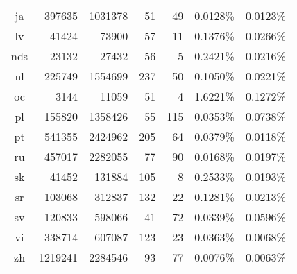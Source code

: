 \documentclass[a4paper]{article}
\begin{document}
\begin{appendix}
\begin{table}[H]
\begin{tabular}{c|r|r|r|r|r|r}
    ja&    397635&   1031378&          51&         49&      0.0128\% &   0.0123\% \\
    lv&     41424&     73900&          57&         11&      0.1376\% &   0.0266\% \\
   nds&     23132&     27432&          56&          5&      0.2421\% &   0.0216\% \\
    nl&    225749&   1554699&         237&         50&      0.1050\% &   0.0221\% \\
    oc&      3144&     11059&          51&          4&      1.6221\% &   0.1272\% \\
    pl&    155820&   1358426&          55&        115&      0.0353\% &   0.0738\% \\
    pt&    541355&   2424962&         205&         64&      0.0379\% &   0.0118\% \\
    ru&    457017&   2282055&          77&         90&      0.0168\% &   0.0197\% \\
    sk&     41452&    131884&         105&          8&      0.2533\% &   0.0193\% \\
    sr&    103068&    312837&         132&         22&      0.1281\% &   0.0213\% \\
    sv&    120833&    598066&          41&         72&      0.0339\% &   0.0596\% \\
    vi&    338714&    607087&         123&         23&      0.0363\% &   0.0068\% \\
    zh&   1219241&   2284546&          93&         77&      0.0076\% &   0.0063\% \\
\bottomrule
\end{tabular}
\end{table}

\end{appendix}
\end{document}
